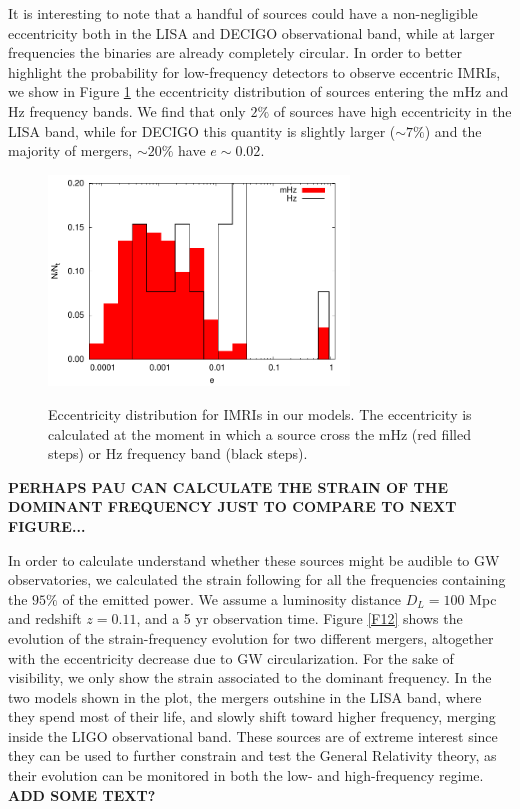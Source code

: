 \documentclass[twocolumn]{aastex62}
\begin{document}
It is interesting to note that a handful of sources could have a non-negligible eccentricity both in the LISA and DECIGO observational band, while at larger frequencies the binaries are already completely circular. In order to better highlight the probability for low-frequency detectors to observe eccentric IMRIs, we show in Figure \ref{F11} the eccentricity distribution of sources entering the mHz and Hz frequency bands. We find that only $2\%$ of sources have high eccentricity in the LISA band, while for DECIGO this quantity is slightly larger ($\sim 7\%$) and the majority of mergers, $\sim 20\%$ have $e\sim 0.02$.

\begin{figure}
\centering
\includegraphics[width=8cm]{ecc_distri_merge}\\
\caption{Eccentricity distribution for IMRIs in our models. The eccentricity is calculated at the moment in which a source cross the mHz (red filled steps) or Hz frequency band (black steps).}
\label{F11}
\end{figure}



{\bf PERHAPS PAU CAN CALCULATE THE STRAIN OF THE DOMINANT FREQUENCY JUST TO COMPARE TO NEXT FIGURE...}

In order to calculate understand whether these sources might be audible to GW observatories, we calculated the strain following \cite{kocsis12} for all the frequencies containing the $95\%$ of the emitted power. We assume a luminosity distance $D_L = 100$ Mpc and redshift $z=0.11$, and a 5 yr observation time. Figure \ref{F12} shows the evolution of the strain-frequency evolution for two different mergers, altogether with the eccentricity decrease due to GW circularization. For the sake of visibility, we only show the strain associated to the dominant frequency. In the two models shown in the plot, the mergers outshine in the LISA band, where they spend most of their life, and slowly shift toward higher frequency, merging inside the LIGO observational band. These sources are of extreme interest since they can be used to further constrain and test the General Relativity theory, as their evolution can be monitored in both the low- and high-frequency regime. {\bf ADD SOME TEXT?}
\end{document}
